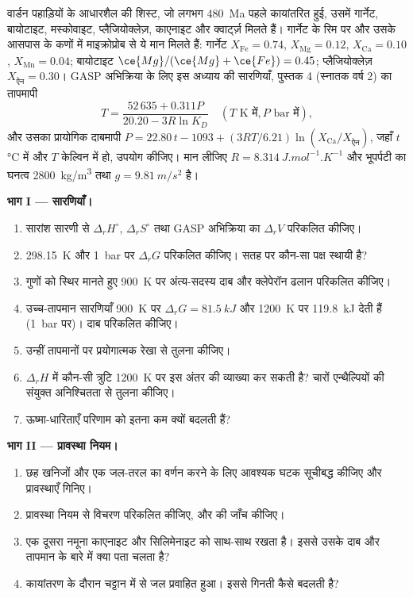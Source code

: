 \begin{problem}[{सप्ताहांत समस्या --- एक काल्पनिक शिस्ट का दाब और तापमान,
सारणियों, प्रावस्था नियम, सक्रियता मॉडल और
थर्मोबैरोमेट्री से}]
\label{pb:b3:petrological-thermodynamics:1}
वार्डन पहाड़ियों के आधारशैल की शिस्ट, जो लगभग
\qty{480}{Ma} पहले कायांतरित हुई, उसमें गार्नेट, बायोटाइट, मस्कोवाइट, प्लैजियोक्लेज़, काएनाइट और
क्वार्ट्ज़ मिलते हैं। गार्नेट के रिम पर और उसके आसपास के कणों में माइक्रोप्रोब
से ये मान मिलते हैं: गार्नेट $X_{\text{Fe}} = 0.74$, $X_{\text{Mg}} = 0.12$, $X_{\text{Ca}} =
0.10$, $X_{\text{Mn}} = 0.04$; बायोटाइट $\ce{Mg}/(\ce{Mg} + \ce{Fe}) = 0.45$;
प्लैजियोक्लेज़ $X_{\text{ऐन}} = 0.30$। GASP अभिक्रिया के लिए इस अध्याय की सारणियाँ,
पुस्तक 4 (स्नातक वर्ष 2) का तापमापी
\[
T = \frac{52\,635 + 0.311P}{20.20 - 3R\ln K_D}\quad(T \text{ K में}, P
\text{ bar में}),
\]
और उसका प्रायोगिक दाबमापी $P = 22.80\,t - 1093 + (3RT/6.21)\ln
(X_{\text{Ca}}/X_{\text{ऐन}})$, जहाँ $t$ \unit{\celsius} में और $T$ केल्विन में हो, उपयोग कीजिए।
मान लीजिए $R = \qty{8.314}{J.mol^{-1}.K^{-1}}$ और भूपर्पटी का
घनत्व \qty{2800}{kg/m^3} तथा $g = \qty{9.81}{m/s^2}$ है।

\medskip\noindent\textbf{भाग I --- सारणियाँ।}
\begin{enumerate}
  \item सारांश सारणी से $\Delta_rH^\circ$, $\Delta_rS^\circ$
        तथा GASP अभिक्रिया का $\Delta_rV$ परिकलित कीजिए।
  \item \qty{298.15}{K} और \qty{1}{bar} पर $\Delta_rG$ परिकलित कीजिए। सतह पर
        कौन-सा पक्ष स्थायी है?
  \item गुणों को स्थिर मानते हुए \qty{900}{K} पर अंत्य-सदस्य दाब
        और क्लेपेरॉन ढलान परिकलित कीजिए।
  \item उच्च-तापमान सारणियाँ \qty{900}{K} पर $\Delta_rG = \qty{81.5}{kJ}$ और
        \qty{1200}{K} पर \qty{119.8}{kJ} देती हैं (\qty{1}{bar} पर)।
        दाब परिकलित कीजिए।
  \item उन्हीं तापमानों पर प्रयोगात्मक रेखा से तुलना कीजिए।
  \item $\Delta_rH$ में कौन-सी त्रुटि \qty{1200}{K} पर इस अंतर की व्याख्या कर सकती है?
        चारों एन्थैल्पियों की संयुक्त अनिश्चितता से तुलना कीजिए।
  \item ऊष्मा-धारिताएँ परिणाम को इतना कम क्यों बदलती हैं?
\end{enumerate}

\medskip\noindent\textbf{भाग II --- प्रावस्था नियम।}
\begin{enumerate}[resume]
  \item छह खनिजों और एक जल-तरल का वर्णन करने के लिए आवश्यक घटक सूचीबद्ध कीजिए
        और प्रावस्थाएँ गिनिए।
  \item प्रावस्था नियम से विचरण परिकलित कीजिए, और
         की जाँच कीजिए।
  \item एक दूसरा नमूना काएनाइट और सिलिमेनाइट को साथ-साथ रखता है।
        इससे उसके दाब और तापमान के बारे में क्या पता चलता है?
  \item कायांतरण के दौरान चट्टान में से जल प्रवाहित हुआ। इससे
        गिनती कैसे बदलती है?
\end{enumerate}


\end{problem}
